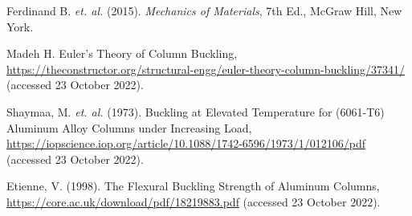 \documentclass{article}
\begin{document}
    \begin{description}
        \item Ferdinand B. \emph{et. al.} (2015). \emph{Mechanics of Materials}, 7th Ed., McGraw Hill, New York.
        \item Madeh H. Euler's Theory of Column Buckling, \url{https://theconstructor.org/structural-engg/euler-theory-column-buckling/37341/} (accessed 23 October 2022).
        \item Shaymaa, M. \emph{et. al.} (1973). Buckling at Elevated Temperature for (6061-T6) Aluminum Alloy Columns under Increasing Load, \url{https://iopscience.iop.org/article/10.1088/1742-6596/1973/1/012106/pdf} (accessed 23 October 2022).
        \item Etienne, V. (1998). The Flexural Buckling Strength of Aluminum Columns, \url{https://core.ac.uk/download/pdf/18219883.pdf} (accessed 23 October 2022).
    \end{description}
    \newpage
\end{document}
